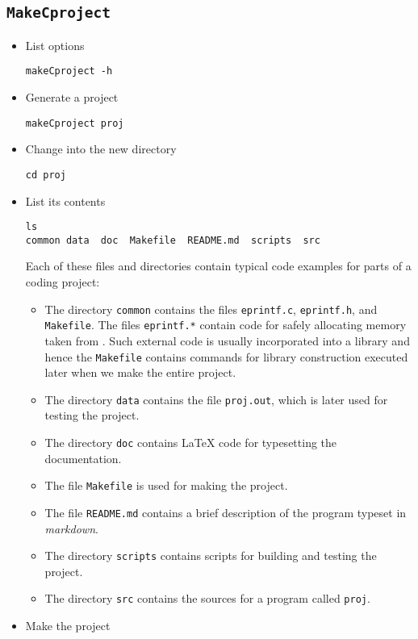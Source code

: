 \documentclass[a4paper, english]{article}
\begin{document}
\subsection{\texttt{MakeCproject}}
\begin{itemize}
\item List options
\begin{verbatim}
makeCproject -h
\end{verbatim}
\item Generate a project
\begin{verbatim}
makeCproject proj
\end{verbatim}
\item Change into the new directory
\begin{verbatim}
cd proj
\end{verbatim}
\item List its contents
\begin{verbatim}
ls
common data  doc  Makefile  README.md  scripts  src
\end{verbatim}
Each of these files and directories contain typical code examples for
parts of a coding project:
\begin{itemize}
  \item The directory \texttt{common} contains the files \texttt{eprintf.c},
    \texttt{eprintf.h}, and \texttt{Makefile}. The files
    \texttt{eprintf.*} contain code for safely allocating memory taken
    from  \citep[ch. 4]{ker99:pra}. Such external code is usually
    incorporated into a library and hence the \texttt{Makefile}
    contains commands for library construction executed later when we
    make the entire project.
  \item The directory \texttt{data} contains the file
    \texttt{proj.out}, which is later used for testing the project.
  \item The directory \texttt{doc} contains \LaTeX{} code for
    typesetting the documentation.
  \item The file \texttt{Makefile} is used for making the project.
  \item The file \texttt{README.md} contains a brief description of the
    program typeset in \emph{markdown}.
  \item The directory \texttt{scripts} contains scripts for building
    and testing the project.
  \item The directory \texttt{src} contains the sources for a program
    called \texttt{proj}.
\end{itemize}
\item Make the project

\end{itemize}
\end{document}
